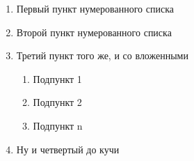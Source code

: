 \documentclass[a4paper,12pt]{article}
\begin{document}
\begin{enumerate}
  \item{Первый пункт нумерованного списка}
  \item{Второй пункт нумерованного списка}
  \item{Третий пункт того же, и со вложенными}
    \begin{enumerate}
      \item{Подпункт 1}
      \item{Подпункт 2}
      \item{Подпункт n}
    \end{enumerate}
  \item{Ну и четвертый до кучи}
\end{enumerate}
\end{document}
